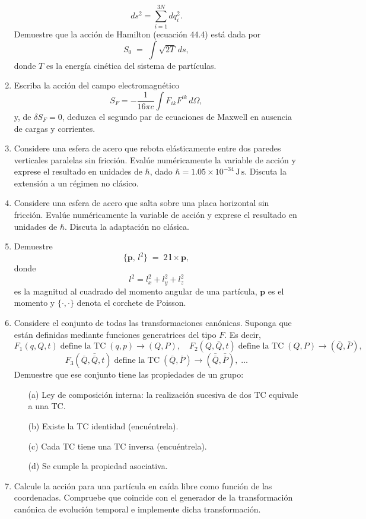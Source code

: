 \documentclass[12pt]{article}
\begin{document}
\begin{enumerate}
    \[
      ds^2 = \sum_{i=1}^{3N} dq_i^2.
    \]
    Demuestre que la acción de Hamilton (ecuación 44.4) está dada por
    \[
      S_0 \;=\; \int \sqrt{2T}\,ds,
    \]
    donde \(T\) es la energía cinética del sistema de partículas.
  \item Escriba la acción del campo electromagnético
    \[
      S_F = -\frac{1}{16\pi c}\int F_{ik}F^{ik}\,d\Omega,
    \]
    y, de \(\delta S_F=0\), deduzca el segundo par de ecuaciones de Maxwell en ausencia de cargas y corrientes.
  \item Considere una esfera de acero que rebota elásticamente entre dos paredes verticales paralelas sin fricción. Evalúe numéricamente la variable de acción y exprese el resultado en unidades de \(\hbar\), dado \(\hbar=1.05\times10^{-34}\,\mathrm{J\,s}\). Discuta la extensión a un régimen no clásico.
  \item Considere una esfera de acero que salta sobre una placa horizontal sin fricción. Evalúe numéricamente la variable de acción y exprese el resultado en unidades de \(\hbar\). Discuta la adaptación no clásica.
  \item Demuestre
    \[
      \{\mathbf{p},\,l^2\} \;=\; 2\,\mathbf{l}\times\mathbf{p},
    \]
    donde
    \[
      l^2 = l_x^2 + l_y^2 + l_z^2
    \]
    es la magnitud al cuadrado del momento angular de una partícula, 
    \(\mathbf{p}\) es el momento y \(\{\cdot,\cdot\}\) denota el corchete de Poisson.
  \item Considere el conjunto de todas las transformaciones canónicas. Suponga que están 
    definidas mediante funciones generatrices del tipo \(F\). Es decir,
    \[
      F_1(q,Q,t)\;\text{define la TC}\;(q,p)\to(Q,P), 
      \quad
      F_2(Q,\bar Q,t)\;\text{define la TC}\;(Q,P)\to(\bar Q,\bar P), 
    \]
    \[
      F_3(\bar Q,\bar{\bar Q},t)\;\text{define la TC}\;(\bar Q,\bar P)\to(\bar{\bar Q},\bar{\bar P}), 
      \;\dots
    \]
    Demuestre que ese conjunto tiene las propiedades de un grupo:
    \begin{enumerate}
      \item[(a)] Ley de composición interna: la realización sucesiva de dos TC equivale a una TC.
      \item[(b)] Existe la TC identidad (encuéntrela).
      \item[(c)] Cada TC tiene una TC inversa (encuéntrela).
      \item[(d)] Se cumple la propiedad asociativa.
    \end{enumerate}

  \item Calcule la acción para una partícula en caída libre como función de las coordenadas. 
    Compruebe que coincide con el generador de la transformación canónica de evolución temporal 
    e implemente dicha transformación.
\end{enumerate}
\end{document}
